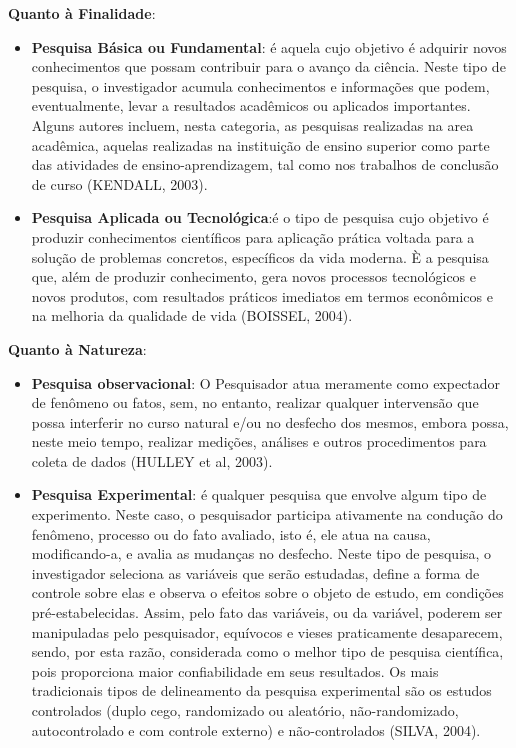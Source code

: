 \textbf{Quanto à Finalidade}: 

\begin{itemize}
\item \textbf{Pesquisa Básica ou Fundamental}: é aquela cujo objetivo é adquirir novos conhecimentos que possam contribuir para o avanço da ciência. Neste tipo de pesquisa, o investigador acumula conhecimentos e informações que podem, eventualmente, levar a resultados acadêmicos ou aplicados importantes. Alguns autores incluem, nesta categoria, as pesquisas realizadas na area acadêmica, aquelas realizadas na instituição de ensino superior como parte das atividades de ensino-aprendizagem, tal como nos trabalhos de conclusão de curso (KENDALL, 2003). 
\item \textbf{Pesquisa Aplicada ou Tecnológica}:é o tipo de pesquisa cujo objetivo é produzir conhecimentos científicos para aplicação prática voltada para a solução de problemas concretos, específicos da vida moderna. È a pesquisa que, além de produzir conhecimento, gera novos processos tecnológicos e novos produtos, com resultados práticos imediatos em termos econômicos e na melhoria da qualidade de vida (BOISSEL, 2004).
\end{itemize}

\textbf{Quanto à Natureza}: 

\begin{itemize}
\item \textbf{Pesquisa observacional}: O Pesquisador atua meramente como expectador de fenômeno ou fatos, sem, no entanto, realizar qualquer intervensão que possa interferir no curso natural e/ou no desfecho dos mesmos, embora possa, neste meio tempo, realizar medições, análises e outros procedimentos para coleta de dados (HULLEY et al, 2003).
\item \textbf{Pesquisa Experimental}: é qualquer pesquisa que envolve algum tipo de experimento. Neste caso, o pesquisador participa ativamente na condução do fenômeno, processo ou do fato avaliado, isto é, ele atua na causa, modificando-a, e avalia as mudanças no desfecho. Neste tipo de pesquisa, o investigador seleciona as variáveis que serão estudadas, define a forma de controle sobre elas e observa o efeitos sobre o objeto de estudo, em condições pré-estabelecidas. Assim, pelo fato das variáveis, ou da variável, poderem ser manipuladas pelo pesquisador, equívocos e vieses praticamente  desaparecem, sendo, por esta razão, considerada como o melhor tipo de pesquisa científica, pois proporciona maior confiabilidade em seus resultados. Os mais tradicionais tipos de delineamento da pesquisa experimental são os estudos controlados (duplo cego, randomizado ou aleatório, não-randomizado, autocontrolado e com controle externo) e não-controlados (SILVA, 2004). 
\end{itemize}


